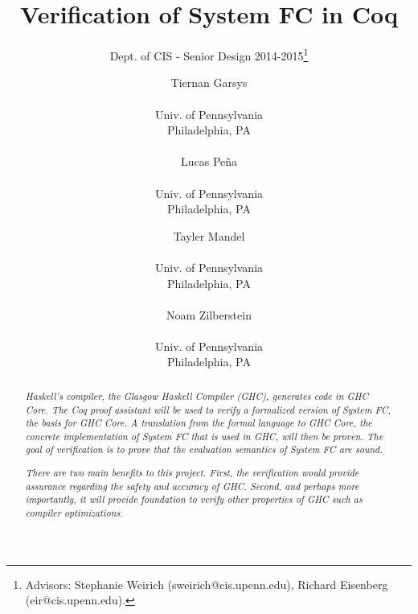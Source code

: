 \documentclass{sig-alternate}
\begin{document}
 

\title{Verification of System FC in Coq}
\subtitle{Dept. of CIS - Senior Design 2014-2015\thanks{Advisors: Stephanie Weirich (sweirich@cis.upenn.edu), Richard Eisenberg (eir@cis.upenn.edu).}}
\author{
  Tiernan Garsys \\  \\ Univ. of Pennsylvania \\ Philadelphia, PA\\\\
  Lucas Pe\~{n}a \\  \\ Univ. of Pennsylvania \\ Philadelphia, PA
  \and
  Tayler Mandel \\  \\ Univ. of Pennsylvania \\ Philadelphia, PA\\\\
  Noam Zilberstein \\  \\ Univ. of Pennsylvania \\ Philadelphia, PA
}
\date{}
\maketitle

\begin{abstract}
  \textit{
Haskell's compiler, the Glasgow Haskell Compiler (GHC), generates code in GHC Core. The Coq proof assistant will be used to verify a formalized version of System FC, the basis for GHC Core. A translation from the formal language to GHC Core, the concrete implementation of System FC that is used in GHC, will then be proven. The goal of verification is to prove that the evaluation semantics of System FC are sound.
  }

  \textit{
There are two main benefits to this project. First, the verification would provide assurance regarding the safety and accuracy of GHC. Second, and perhaps more importantly, it will provide foundation to verify other properties of GHC such as compiler optimizations.
 }
\end{abstract}
\end{document}
